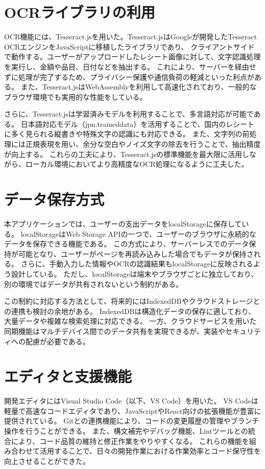 \documentclass[main]{subfiles}
\begin{document}
\section{OCRライブラリの利用}

OCR機能には、Tesseract.jsを用いた。Tesseract.jsはGoogleが開発したTesseract OCRエンジンをJavaScriptに移植したライブラリであり、
クライアントサイドで動作する。ユーザーがアップロードしたレシート画像に対して、文字認識処理を実行し、金額や品目、日付などを抽出する。
これにより、サーバーを経由せずに処理が完了するため、プライバシー保護や通信負荷の軽減といった利点がある。
また、Tesseract.jsはWebAssemblyを利用して高速化されており、一般的なブラウザ環境でも実用的な性能をしている。

さらに、Tesseract.jsは学習済みモデルを利用することで、多言語対応が可能である。
日本語対応モデル（jpn.traineddata）を活用することで、国内のレシートに多く見られる縦書きや特殊文字の認識にも対応できる。
また、文字列の前処理には正規表現を用い、余分な空白やノイズ文字の除去を行うことで、抽出精度が向上する。
これらの工夫により、Tesseract.jsの標準機能を最大限に活用しながら、ローカル環境においてより高精度なOCR処理になるように工夫した。

\section{データ保存方式}

本アプリケーションでは、ユーザーの支出データをlocalStorageに保存している。
localStorageはWeb Storage APIの一つで、ユーザーのブラウザに永続的なデータを保存できる機能である。
この方式により、サーバーレスでのデータ保持が可能となり、ユーザーがページを再読み込みした場合でもデータが保持される。
さらに、手動入力した情報やOCRの認識結果もlocalStorageに反映されるよう設計している。
ただし、localStorageは端末やブラウザごとに独立しており、別の環境ではデータが共有されないという制約がある。

この制約に対応する方法として、将来的にはIndexedDBやクラウドストレージとの連携も検討の余地がある。
IndexedDBは構造化データの保存に適しており、大量データや複雑な検索処理に対応できる。
一方、クラウドサービスを用いた同期機能はマルチデバイス間でのデータ共有を実現できるが、実装やセキュリティへの配慮が必要である。

\section{エディタと支援機能}

開発エディタにはVisual Studio Code（以下、VS Code）を用いた。
VS Codeは軽量で高速なコードエディタであり、JavaScriptやReact向けの拡張機能が豊富に提供されている。
Gitとの連携機能により、コードの変更履歴の管理やブランチ操作を行うことができる。
また、構文補完やデバッグ機能、Lintツールとの統合により、コード品質の維持と修正作業をやりやすくなる。
これらの機能を組み合わせて活用することで、日々の開発作業における作業効率とコード保守性を向上させることができた。
\end{document}
